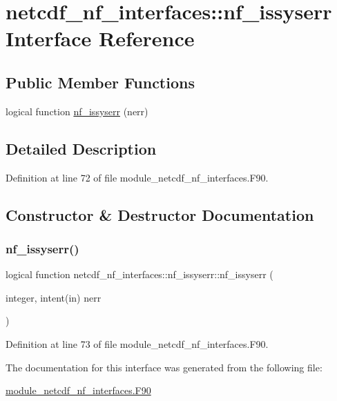 \hypertarget{interfacenetcdf__nf__interfaces_1_1nf__issyserr}{}\section{netcdf\+\_\+nf\+\_\+interfaces\+:\+:nf\+\_\+issyserr Interface Reference}
\label{interfacenetcdf__nf__interfaces_1_1nf__issyserr}
\subsection*{Public Member Functions}
\begin{DoxyCompactItemize}
\item 
logical function \hyperlink{interfacenetcdf__nf__interfaces_1_1nf__issyserr_a6a453955e8f5b2783ab3f15278b5b1ff}{nf\+\_\+issyserr} (nerr)
\end{DoxyCompactItemize}


\subsection{Detailed Description}


Definition at line 72 of file module\+\_\+netcdf\+\_\+nf\+\_\+interfaces.\+F90.



\subsection{Constructor \& Destructor Documentation}
\mbox{\label{interfacenetcdf__nf__interfaces_1_1nf__issyserr_a6a453955e8f5b2783ab3f15278b5b1ff}} 
\subsubsection{\texorpdfstring{nf\+\_\+issyserr()}{nf\_issyserr()}}
{\footnotesize\ttfamily logical function netcdf\+\_\+nf\+\_\+interfaces\+::nf\+\_\+issyserr\+::nf\+\_\+issyserr (\begin{DoxyParamCaption}\item[{integer, intent(in)}]{nerr }\end{DoxyParamCaption})}



Definition at line 73 of file module\+\_\+netcdf\+\_\+nf\+\_\+interfaces.\+F90.



The documentation for this interface was generated from the following file\+:\begin{DoxyCompactItemize}
\item 
\hyperlink{module__netcdf__nf__interfaces_8F90}{module\+\_\+netcdf\+\_\+nf\+\_\+interfaces.\+F90}\end{DoxyCompactItemize}
